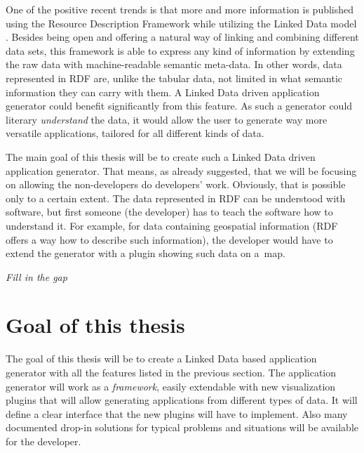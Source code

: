 One of the positive recent trends is that more and more information is published using the Resource Description Framework \cite{rdf} while utilizing the Linked Data model \cite{ld}. Besides being open and offering a natural way of linking and combining different data sets, this framework is able to express any kind of information by extending the raw data with machine-readable semantic meta-data. In other words, data represented in RDF are, unlike the tabular data, not limited in what semantic information they can carry with them. A Linked Data driven application generator could benefit significantly from this feature. As such a generator could literary \textit{understand} the data, it would allow the user to generate way more versatile applications, tailored for all different kinds of data. 
%
%
%
%
%

The main goal of this thesis will be to create such a Linked Data driven application generator. That means, as already suggested, that we will be focusing on allowing the non-developers do developers' work. Obviously, that is possible only to a certain extent. The data represented in RDF can be understood with software, but first someone (the developer) has to teach the software how to understand it. For example, for data containing geospatial information (RDF offers a way how to describe such information), the developer would have to extend the generator with a plugin showing such data on a~map.

\textit{Fill in the gap}

\section*{Goal of this thesis}

The goal of this thesis will be to create a Linked Data based application generator with all the features listed in the previous section. The application generator will work as a \textit{framework}, easily extendable with new visualization plugins that will allow generating applications from different types of data. It will define a clear interface that the new plugins will have to implement. Also many documented drop-in solutions for typical problems and situations will be available for the developer.

